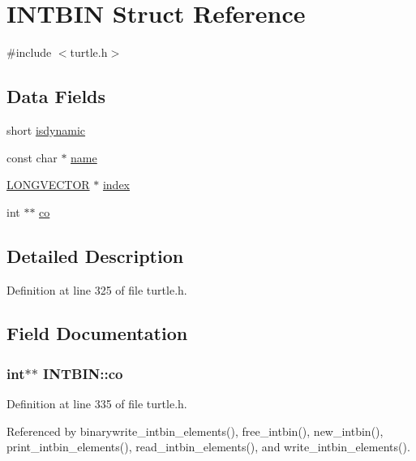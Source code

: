 \hypertarget{struct_i_n_t_b_i_n}{\section{I\-N\-T\-B\-I\-N Struct Reference}
\label{struct_i_n_t_b_i_n}
}


{\ttfamily \#include $<$turtle.\-h$>$}

\subsection*{Data Fields}
\begin{DoxyCompactItemize}
\item 
short \hyperlink{struct_i_n_t_b_i_n_ad45ecc214b13cb42b28e488ee54c541a}{isdynamic}
\item 
const char $\ast$ \hyperlink{struct_i_n_t_b_i_n_a6d65e8d76c65b5049011a444aa2060fd}{name}
\item 
\hyperlink{struct_l_o_n_g_v_e_c_t_o_r}{L\-O\-N\-G\-V\-E\-C\-T\-O\-R} $\ast$ \hyperlink{struct_i_n_t_b_i_n_af0c75ad6df4bb99206cf6aeebe7181a9}{index}
\item 
int $\ast$$\ast$ \hyperlink{struct_i_n_t_b_i_n_a06067b2384e6b9f6c5c9d890129000bf}{co}
\end{DoxyCompactItemize}


\subsection{Detailed Description}


Definition at line 325 of file turtle.\-h.



\subsection{Field Documentation}
\hypertarget{struct_i_n_t_b_i_n_a06067b2384e6b9f6c5c9d890129000bf}{
\subsubsection[{co}]{\setlength{\rightskip}{0pt plus 5cm}int$\ast$$\ast$ I\-N\-T\-B\-I\-N\-::co}}\label{struct_i_n_t_b_i_n_a06067b2384e6b9f6c5c9d890129000bf}


Definition at line 335 of file turtle.\-h.



Referenced by binarywrite\-\_\-intbin\-\_\-elements(), free\-\_\-intbin(), new\-\_\-intbin(), print\-\_\-intbin\-\_\-elements(), read\-\_\-intbin\-\_\-elements(), and write\-\_\-intbin\-\_\-elements().

